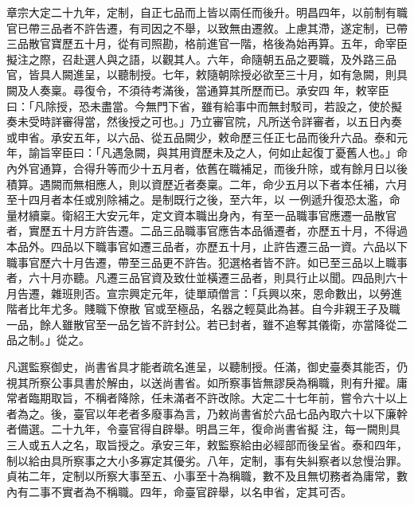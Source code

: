 \begin{pinyinscope}
 章宗大定二十九年，定制，自正七品而上皆以兩任而後升。明昌四年，以前制有職官已帶三品者不許告遷，有司因之不舉，以致無由遷敘。上慮其滯，遂定制，已帶三品散官寶歷五十月，從有司照勘，格前進官一階，格後為始再算。五年，命宰臣擬注之際，召赴選人與之語，以觀其人。六年，命隨朝五品之要職，及外路三品官，皆具人闕進呈，以聽制授。七年，敕隨朝除授必欲至三十月，如有急闕，則具闕及人奏稟。尋復令，不須待考滿後，當通算其所歷而已。承安四
 年，敕宰臣曰：「凡除授，恐未盡當。今無門下省，雖有給事中而無封駁司，若設之，使於擬奏未受時詳審得當，然後授之可也。」乃立審官院，凡所送令詳審者，以五日內奏或申省。承安五年，以六品、從五品闕少，敕命歷三任正七品而後升六品。泰和元年，諭旨宰臣曰：「凡遇急闕，與其用資歷未及之人，何如止起復丁憂舊人也。」命內外官通算，合得升等而少十五月者，依舊在職補足，而後升除，或有餘月日以後積算。遇闕而無相應人，則以資歷近者奏稟。二年，命少五月以下者本任補，六月至十四月者本任或別除補之。是制既行之後，至六年，以
 一例遞升復恐太濫，命量材續稟。衛紹王大安元年，定文資本職出身內，有至一品職事官應遷一品散官者，實歷五十月方許告遷。二品三品職事官應告本品循遷者，亦歷五十月，不得過本品外。四品以下職事官如遷三品者，亦歷五十月，止許告遷三品一資。六品以下職事官歷六十月告遷，帶至三品更不許告。犯選格者皆不許。如已至三品以上職事者，六十月亦聽。凡遷三品官資及致仕並橫遷三品者，則具行止以聞。四品則六十月告遷，雜班則否。宣宗興定元年，徒單頑僧言：「兵興以來，恩命數出，以勞進階者比年尤多。賤職下僚散
 官或至極品，名器之輕莫此為甚。自今非親王子及職一品，餘人雖散官至一品乞皆不許封公。若已封者，雖不追奪其儀衛，亦當降從二品之制。」從之。



 凡選監察御史，尚書省具才能者疏名進呈，以聽制授。任滿，御史臺奏其能否，仍視其所察公事具書於解由，以送尚書省。如所察事皆無謬戾為稱職，則有升擢。庸常者臨期取旨，不稱者降除，任未滿者不許改除。大定二十七年前，嘗令六十以上者為之。後，臺官以年老者多廢事為言，乃敕尚書省於六品七品內取六十以下廉幹者備選。二十九年，令臺官得自辟舉。明昌三年，復命尚書省擬
 注，每一闕則具三人或五人之名，取旨授之。承安三年，敕監察給由必經部而後呈省。泰和四年，制以給由具所察事之大小多寡定其優劣。八年，定制，事有失糾察者以怠慢治罪。貞祐二年，定制以所察大事至五、小事至十為稱職，數不及且無切務者為庸常，數內有二事不實者為不稱職。四年，命臺官辟舉，以名申省，定其可否。




\end{pinyinscope}
